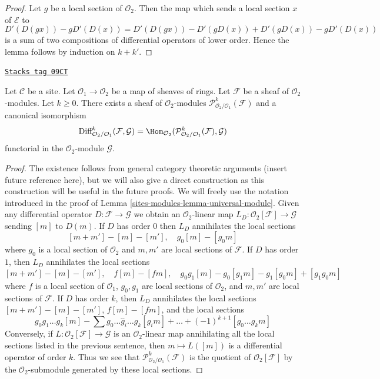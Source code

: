 \begin{proof}
Let $g$ be a local section of $\mathcal{O}_2$.
Then the map which sends a local section $x$ of $\mathcal{E}$ to
$$
D'(D(gx)) - gD'(D(x)) = D'(D(gx)) - D'(gD(x)) + D'(gD(x)) - gD'(D(x))
$$
is a sum of two compositions of differential operators of lower order.
Hence the lemma follows by induction on $k + k'$.
\end{proof}

\begin{lemma}
\label{sites-modules-lemma-module-principal-parts}
\href{https://stacks.math.columbia.edu/tag/09CT}{\texttt{Stacks tag 09CT}}

Let $\mathcal{C}$ be a site.
Let $\mathcal{O}_1 \to \mathcal{O}_2$ be a map of sheaves of rings.
Let $\mathcal{F}$ be a sheaf of $\mathcal{O}_2$-modules.
Let $k \geq 0$. There exists a sheaf of $\mathcal{O}_2$-modules
$\mathcal{P}^k_{\mathcal{O}_2/\mathcal{O}_1}(\mathcal{F})$
and a canonical isomorphism
$$
\text{Diff}^k_{\mathcal{O}_2/\mathcal{O}_1}(\mathcal{F}, \mathcal{G}) =
\Hom_{\mathcal{O}_2}(
\mathcal{P}^k_{\mathcal{O}_2/\mathcal{O}_1}(\mathcal{F}), \mathcal{G})
$$
functorial in the $\mathcal{O}_2$-module $\mathcal{G}$.
\end{lemma}

\begin{proof}
The existence follows from general category theoretic arguments
(insert future reference here), but we will also give a direct
construction as this construction will be useful in the future proofs.
We will freely use the notation introduced in the proof of
Lemma \ref{sites-modules-lemma-universal-module}.
Given any differential operator $D : \mathcal{F} \to \mathcal{G}$
we obtain an $\mathcal{O}_2$-linear map
$L_D : \mathcal{O}_2[\mathcal{F}] \to \mathcal{G}$
sending $[m]$ to $D(m)$. If $D$ has order $0$
then $L_D$ annihilates the local sections
$$
[m + m'] - [m] - [m'],\quad
g_0[m] - [g_0m]
$$
where $g_0$ is a local section of $\mathcal{O}_2$ and $m, m'$
are local sections of $\mathcal{F}$. If $D$ has order $1$, then $L_D$
annihilates the local sections
$$
[m + m'] - [m] - [m'],\quad
f[m] - [fm], \quad
g_0g_1[m] - g_0[g_1m] - g_1[g_0m] + [g_1g_0m]
$$
where $f$ is a local section of $\mathcal{O}_1$,
$g_0, g_1$ are local sections of $\mathcal{O}_2$, and
$m, m'$ are local sections of $\mathcal{F}$.
If $D$ has order $k$, then $L_D$ annihilates the local sections
$[m + m'] - [m] - [m']$, $f[m] - [fm]$, and the local sections
$$
g_0g_1\ldots g_k[m] - \sum g_0 \ldots \hat g_i \ldots g_k[g_im] + \ldots
+(-1)^{k + 1}[g_0\ldots g_km]
$$
Conversely, if $L : \mathcal{O}_2[\mathcal{F}] \to \mathcal{G}$ is an
$\mathcal{O}_2$-linear map annihilating all the local sections
listed in the previous sentence, then $m \mapsto L([m])$ is a
differential operator of order $k$. Thus we see that
$\mathcal{P}^k_{\mathcal{O}_2/\mathcal{O}_1}(\mathcal{F})$
is the quotient of $\mathcal{O}_2[\mathcal{F}]$
by the $\mathcal{O}_2$-submodule generated by these local sections.
\end{proof}

